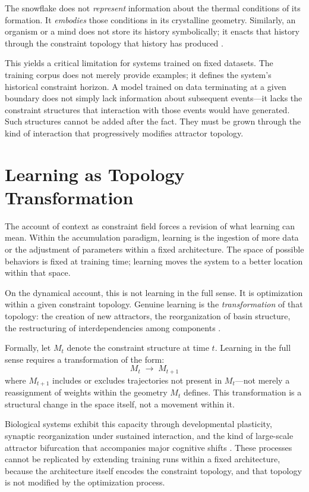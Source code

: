 \documentclass[11pt]{article}
\begin{document}
The snowflake does not \emph{represent} information about the thermal conditions of its
formation. It \emph{embodies} those conditions in its crystalline geometry. Similarly,
an organism or a mind does not store its history symbolically; it enacts that history
through the constraint topology that history has produced \citep{deacon2012}.

This yields a critical limitation for systems trained on fixed datasets. The training
corpus does not merely provide examples; it defines the system's historical constraint
horizon. A model trained on data terminating at a given boundary does not simply lack
information about subsequent events---it lacks the constraint structures that interaction
with those events would have generated. Such structures cannot be added after the fact.
They must be grown through the kind of interaction that progressively modifies attractor
topology.

\section{Learning as Topology Transformation}

The account of context as constraint field forces a revision of what learning can mean.
Within the accumulation paradigm, learning is the ingestion of more data or the adjustment
of parameters within a fixed architecture. The space of possible behaviors is fixed at
training time; learning moves the system to a better location within that space.

On the dynamical account, this is not learning in the full sense. It is optimization
within a given constraint topology. Genuine learning is the \emph{transformation} of that
topology: the creation of new attractors, the reorganization of basin structure, the
restructuring of interdependencies among components \citep{kauffman1993,beer2000}.

Formally, let $M_t$ denote the constraint structure at time $t$. Learning in the full
sense requires a transformation of the form:
\[
M_t \;\longrightarrow\; M_{t+1}
\]
where $M_{t+1}$ includes or excludes trajectories not present in $M_t$---not merely a
reassignment of weights within the geometry $M_t$ defines. This transformation is a
structural change in the space itself, not a movement within it.

Biological systems exhibit this capacity through developmental plasticity, synaptic
reorganization under sustained interaction, and the kind of large-scale attractor
bifurcation that accompanies major cognitive shifts \citep{kelso1995,thelen1994}. These
processes cannot be replicated by extending training runs within a fixed architecture,
because the architecture itself encodes the constraint topology, and that topology is not
modified by the optimization process.
\end{document}
